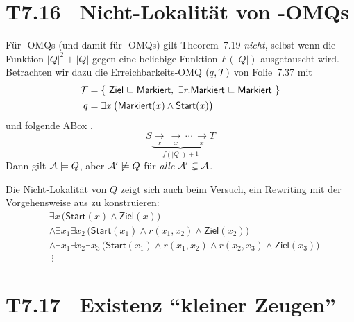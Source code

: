 \documentclass[fontsize=11pt, twoside=false, numbers=autoenddot]{scrbook}
\begin{document}
\enlargethispage{12mm}
\section*{T7.16~ {\boldmath Nicht-Lokalität von \EL-OMQs}}

Für \EL-OMQs (und damit für \ALC-OMQs) gilt Theorem~7.19 \emph{nicht},
selbst wenn die Funktion $|Q|^2+|Q|$ gegen eine beliebige Funktion
$F(|Q|)$ ausgetauscht wird. Betrachten wir dazu die Erreichbarkeits-OMQ
$(q,\mathcal{T})$ von Folie~7.37 mit
%
\begin{align*}
  \mathcal{T} & = \{~  \textsf{Ziel} \sqsubseteq \textsf{Markiert},~ \exists r.\textsf{Markiert} \sqsubseteq \textsf{Markiert} ~\} \\
  q    & = \exists x \, \big(\textsf{Markiert}(x) \wedge \textsf{Start}(x)\big)
\end{align*}
%
und folgende ABox \Amc.
\vspace*{-\baselineskip}
\[
  S \mathrel{\underbrace{\underset{x}{\longrightarrow}\, \underset{x}{\longrightarrow} \,\cdots\, \underset{x}{\longrightarrow}}_{f(|Q|)+1}} T
\]
Dann gilt $\mathcal{A} \models Q$, aber $\mathcal{A}' \not\models Q$
für \emph{alle} $\mathcal{A}' \subsetneq \mathcal{A}$.

\parII
Die Nicht-Lokalität von $Q$ zeigt sich auch beim Versuch,
ein Rewriting mit der Vorgehensweise aus
\textsf{\hyperlink{BspRewriting}{\BspRewriting}} zu konstruieren:
%
\begin{align*}
  & \exists x\,\big(\textsf{Start}(x) \land \textsf{Ziel}(x)\big) \\
  & \land \exists x_1\exists x_2\,\big(\textsf{Start}(x_1) \land r(x_1,x_2) \land \textsf{Ziel}(x_2)\big) \\
  & \land \exists x_1\exists x_2\exists x_3\,\big(\textsf{Start}(x_1) \land r(x_1,x_2) \land r(x_2,x_3) \land \textsf{Ziel}(x_3)\big) \\[-4pt]
  & \;\vdots
\end{align*}

\section*{T7.17~ {\boldmath Existenz "`kleiner Zeugen"'}}
\end{document}
